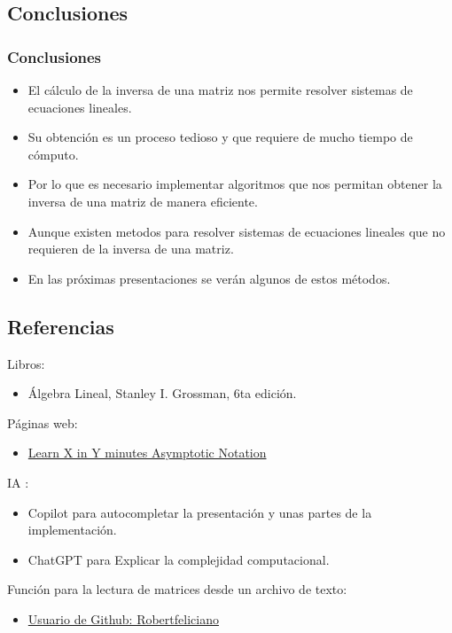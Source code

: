 \documentclass{beamer}
\begin{document}
    \subsection{Conclusiones}
    \begin{frame}
        \frametitle{Conclusiones}
        \begin{itemize}
            \item El cálculo de la inversa de una matriz nos permite resolver sistemas de ecuaciones lineales.\\
            \item Su obtención es un proceso tedioso y que requiere de mucho tiempo de cómputo.\\
            \item Por lo que es necesario implementar algoritmos que nos permitan obtener la inversa de una matriz de manera eficiente.\\
            \item Aunque existen metodos para resolver sistemas de ecuaciones lineales que no requieren de la inversa de una matriz.\\
            \item En las próximas presentaciones se verán algunos de estos métodos.
        \end{itemize}
    \end{frame}
    \subsection{Referencias}
    \begin{frame}
        Libros:
        \begin{itemize}
            \item Álgebra Lineal, Stanley I. Grossman, 6ta edición.
        \end{itemize}
        Páginas web:
        \begin{itemize}
            \item\href{https://learnxinyminutes.com/docs/asymptotic-notation}{Learn X in Y minutes Asymptotic Notation}
        \end{itemize}
        IA :
        \begin{itemize}
            \item Copilot para autocompletar la presentación y unas partes de la implementación.
            \item ChatGPT para Explicar la complejidad computacional.
        \end{itemize}
        Función para la lectura de matrices desde un archivo de texto:
        \begin{itemize}
        \item \href{https://github.com/robertfeliciano/linear-rustgebra/blob/main/src/lib.rs}{Usuario de Github: Robertfeliciano}
        \end{itemize}
    \end{frame}
\end{document}
